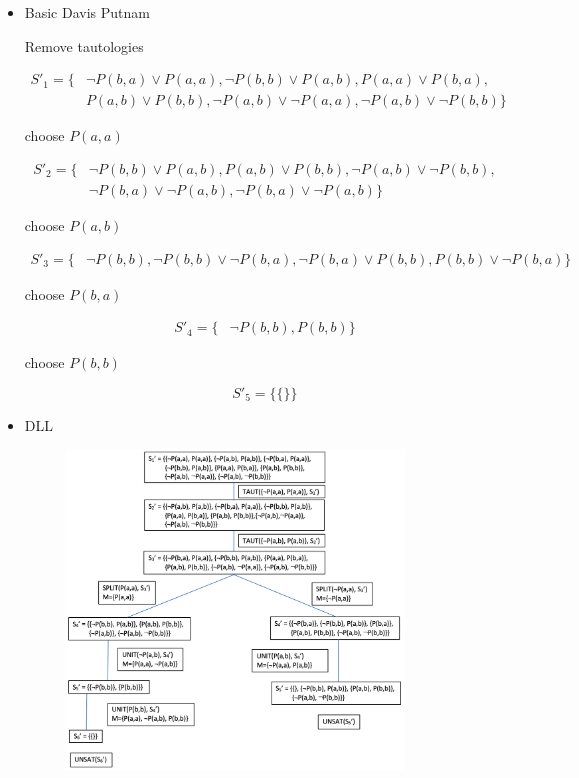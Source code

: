 \documentclass[12pt]{article}
\begin{document}
\begin{itemize}

\item Basic Davis Putnam

Remove tautologies

\begin{align*}
S'_1 = \{ &
\neg P(b,a) \lor P(a,a), \neg P(b,b) \lor P(a,b),
P(a,a) \lor P(b,a), \\&
P(a,b) \lor P(b,b),
\neg P(a,b) \lor \neg P(a,a), \neg P(a,b) \lor \neg P(b,b)
\}
\end{align*}

choose $P(a,a)$

\begin{align*}
S'_2 = \{ &
\neg P(b,b) \lor P(a,b),
P(a,b) \lor P(b,b),
\neg P(a,b) \lor \neg P(b,b),
\\&\neg P(b,a) \lor \neg P(a,b), 
\neg P(b,a) \lor \neg P(a,b)
\}
\end{align*}

choose $P(a,b)$

\begin{align*}
S'_3= \{&
\neg P(b,b), \neg P(b,b)\lor \neg P(b,a), 
\neg P(b,a) \lor P(b,b), P(b,b) \lor \neg P(b,a)
\}
\end{align*}

choose $P(b,a)$

\begin{align*}
S'_4= \{&
\neg P(b,b), P(b,b)
\}
\end{align*}

choose $P(b,b)$

$$
S'_5 = \{ \{ \} \}
$$

\item DLL

\begin{figure}[ht!]
\centering
\includegraphics[width=90mm]{part3b.png}
\end{figure}

\end{itemize}
\end{document}
